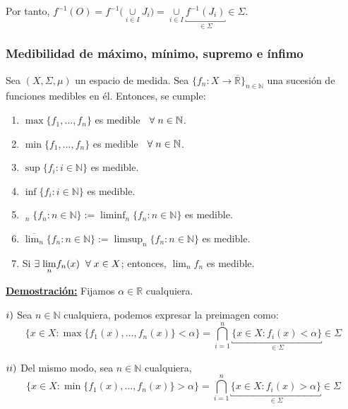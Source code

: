 \documentclass[12pt,a4paper]{article}
\newcommand{\R}{\mathbb{R}}
\newcommand{\N}{\mathbb{N}}
\newcommand{\smallcup}{\mathop{\cup}\limits}
\newcommand{\linf}[1]{\displaystyle{\mathop{\underline{\lim}}_{#1}}}
\newcommand{\mlim}[1]{\displaystyle{\lim_{#1}}}
\newcounter{unit}[section]
\newcounter{chapter}[unit]
\renewcommand{\theunit}{\arabic{unit}}
\renewcommand{\thechapter}{\arabic{chapter}}
\renewcommand{\thesubsubsection}{\theunit.\thechapter.\arabic{subsubsection}}
\newcommand{\result}[1]{%
  \subsubsection{#1}%
  \label{result:\thesubsubsection}
}
\newcommand{\dem}{
    \noindent \underline{\textbf{Demostración:}}
}
\begin{document}
\vspace{2mm}
\noindent Por tanto, $f^{-1}(O) = f^{-1}\Big(\smallcup_{i\in I}J_i\Big) = \smallcup_{i\in I} \underbracket{f^{-1}(J_i)}_{\in\Sigma} \in \Sigma$.

\result{Medibilidad de máximo, mínimo, supremo e ínfimo}
\hspace{3mm} Sea $(X, \Sigma, \mu)$ un espacio de medida. Sea $\{f_n : X \to \overline{\R}\}_{n\in\N}$ una sucesión de funciones medibles en él. Entonces, se cumple:
\begin{enumerate}[label=\roman*)]
    \item $\max \{f_1, \ldots, f_n\}$ es medible $\hspace{2mm} \forall \hspace{1mm} n \in \N$.
    \item $\min \{f_1, \ldots, f_n\}$ es medible $\hspace{2mm} \forall \hspace{1mm} n \in \N$.
    \item $\sup \{f_i : i \in \N\}$ es medible.
    \item $\inf \{f_i : i \in \N\}$ es medible.
    \item $\linf{n} \{f_n : n \in \N\} := \liminf_n \{f_n : n \in \N\}$ es medible.
    \item $\displaystyle \overline{\lim_n} \{f_n : n \in \N\} := \limsup_n \{f_n : n \in \N\}$ es medible.
    \item Si $\exists \hspace{1mm} \mlim{n} f_n(x)  \hspace{2mm} \forall \hspace{1mm} x \in X$; entonces, $\mlim{n} f_n$ es medible.
\end{enumerate}

\dem Fijamos $\alpha \in \R$ cualquiera.

\vspace{2mm}
$\romannumeral 1)$ Sea $n \in \N$ cualquiera, podemos expresar la preimagen como:
\\[-2ex] $$ \Big\{x \in X : \max \{f_1(x), \ldots , f_n(x)\} < \alpha \Big\} = \bigcap_{i=1}^n \underbracket{\{x  \in X : f_i(x) < \alpha\}}_{\in \Sigma} \in \Sigma$$

\vspace{2mm}
$\romannumeral 2)$ Del mismo modo, sea $n \in \N$ cualquiera,
\\[-2ex] $$ \Big\{x \in X : \min \{f_1(x), \ldots , f_n(x)\} > \alpha \Big\} = \bigcap_{i=1}^n \underbracket{\{x  \in X : f_i(x) > \alpha\}}_{\in \Sigma} \in \Sigma$$
\end{document}
